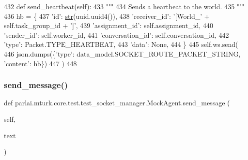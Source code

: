 \begin{DoxyCode}
432     \textcolor{keyword}{def }send\_heartbeat(self):
433         \textcolor{stringliteral}{"""}
434 \textcolor{stringliteral}{        Sends a heartbeat to the world.}
435 \textcolor{stringliteral}{        """}
436         hb = \{
437             \textcolor{stringliteral}{'id'}: \hyperlink{namespacegenerate__task__READMEs_a5b88452ffb87b78c8c85ececebafc09f}{str}(uuid.uuid4()),
438             \textcolor{stringliteral}{'receiver\_id'}: \textcolor{stringliteral}{'[World\_'} + self.task\_group\_id + \textcolor{stringliteral}{']'},
439             \textcolor{stringliteral}{'assignment\_id'}: self.assignment\_id,
440             \textcolor{stringliteral}{'sender\_id'}: self.worker\_id,
441             \textcolor{stringliteral}{'conversation\_id'}: self.conversation\_id,
442             \textcolor{stringliteral}{'type'}: Packet.TYPE\_HEARTBEAT,
443             \textcolor{stringliteral}{'data'}: \textcolor{keywordtype}{None},
444         \}
445         self.ws.send(
446             json.dumps(\{\textcolor{stringliteral}{'type'}: data\_model.SOCKET\_ROUTE\_PACKET\_STRING, \textcolor{stringliteral}{'content'}: hb\})
447         )
448 
\end{DoxyCode}
\mbox{\label{classparlai_1_1mturk_1_1core_1_1test_1_1test__socket__manager_1_1MockAgent_afc1922a7c72563531ab91a1244776f2d}} 
\subsubsection{\texorpdfstring{send\+\_\+message()}{send\_message()}}
{\footnotesize\ttfamily def parlai.\+mturk.\+core.\+test.\+test\+\_\+socket\+\_\+manager.\+Mock\+Agent.\+send\+\_\+message (\begin{DoxyParamCaption}\item[{}]{self,  }\item[{}]{text }\end{DoxyParamCaption})}



